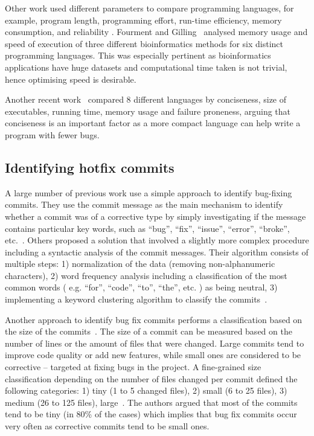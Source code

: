 \documentclass{sig-alternate}
\begin{document}
Other work used different parameters to compare programming languages, for example, program length, programming effort, run-time efficiency, memory consumption, and reliability \cite{Prechelt2000}.  Fourment and Gilling~\cite{Fourment2008} analysed memory usage and speed of execution of three different bioinformatics methods for six distinct programming languages. This was especially pertinent as bioinformatics applications have huge datasets and computational time taken is not trivial, hence optimising speed is desirable.

Another recent work~\cite{Nanz2015} compared 8 different languages by conciseness, size of executables, running time, memory usage and failure proneness, arguing that conciseness is an important factor as a more compact language can help write a program with fewer bugs.

\subsection{Identifying hotfix commits}

A large number of previous work use a simple approach to identify bug-fixing commits. They use the commit message as the main mechanism to identify whether a commit was of a corrective type by simply investigating if the message contains particular key words, such as ``bug'', ``fix'', ``issue'', ``error'', ``broke'', etc.~\cite{Hattori2008, Ratzinger2008, Hindle2008}.  Others proposed a solution that involved a slightly more complex procedure including a syntactic analysis of the commit messages. Their algorithm consists of multiple steps: 1) normalization of the data (removing non-alphanumeric characters), 2) word frequency analysis including a classification of the most common words ( e.g. ``for'', ``code'', ``to'', ``the'', etc. ) as being neutral, 3) implementing a keyword clustering algorithm to classify the commits~\cite{Mockus2000}.

Another approach to identify bug fix commits performs a classification based on the size of the commits~\cite{Hattori2008,Mockus2000,Hindle2008}. The size of a commit can be measured based on the number of lines or the amount of files that were changed. Large commits tend to improve code quality or add new features, while small ones are considered to be corrective -- targeted at fixing bugs in the project. A fine-grained size classification depending on the number of files changed per commit defined the following categories: 1) tiny (1 to 5 changed files), 2) small (6 to 25 files), 3) medium (26 to 125 files), large~\cite{Hattori2008}. The authors argued that most of the commits tend to be tiny (in 80\% of the cases) which implies that bug fix commits occur very often as corrective commits tend to be small ones.
\end{document}
